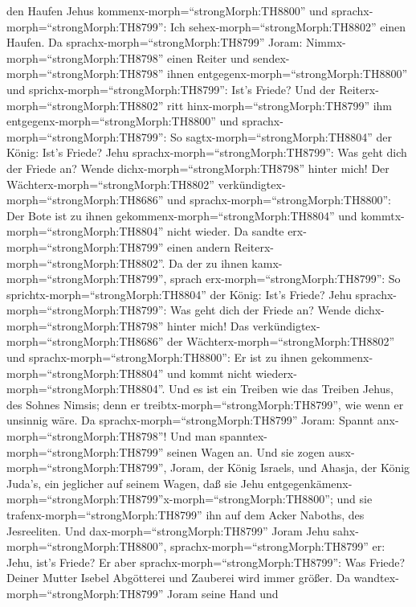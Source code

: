 den Haufen Jehus kommenx-morph=``strongMorph:TH8800'' und
sprachx-morph=``strongMorph:TH8799'': Ich
sehex-morph=``strongMorph:TH8802'' einen Haufen. Da
sprachx-morph=``strongMorph:TH8799'' Joram:
Nimmx-morph=``strongMorph:TH8798'' einen Reiter und
sendex-morph=``strongMorph:TH8798'' ihnen
entgegenx-morph=``strongMorph:TH8800'' und
sprichx-morph=``strongMorph:TH8799'': Ist's Friede?  Und
der Reiterx-morph=``strongMorph:TH8802'' ritt
hinx-morph=``strongMorph:TH8799'' ihm
entgegenx-morph=``strongMorph:TH8800'' und
sprachx-morph=``strongMorph:TH8799'': So
sagtx-morph=``strongMorph:TH8804'' der König: Ist's Friede? Jehu
sprachx-morph=``strongMorph:TH8799'': Was geht dich der Friede an? Wende
dichx-morph=``strongMorph:TH8798'' hinter mich! Der
Wächterx-morph=``strongMorph:TH8802''
verkündigtex-morph=``strongMorph:TH8686'' und
sprachx-morph=``strongMorph:TH8800'': Der Bote ist zu ihnen
gekommenx-morph=``strongMorph:TH8804'' und
kommtx-morph=``strongMorph:TH8804'' nicht wieder.  Da
sandte erx-morph=``strongMorph:TH8799'' einen andern
Reiterx-morph=``strongMorph:TH8802''. Da der zu ihnen
kamx-morph=``strongMorph:TH8799'', sprach
erx-morph=``strongMorph:TH8799'': So
sprichtx-morph=``strongMorph:TH8804'' der König: Ist's Friede? Jehu
sprachx-morph=``strongMorph:TH8799'': Was geht dich der Friede an? Wende
dichx-morph=``strongMorph:TH8798'' hinter mich!  Das
verkündigtex-morph=``strongMorph:TH8686'' der
Wächterx-morph=``strongMorph:TH8802'' und
sprachx-morph=``strongMorph:TH8800'': Er ist zu ihnen
gekommenx-morph=``strongMorph:TH8804'' und kommt nicht
wiederx-morph=``strongMorph:TH8804''. Und es ist ein Treiben wie das
Treiben Jehus, des Sohnes Nimsis; denn er
treibtx-morph=``strongMorph:TH8799'', wie wenn er unsinnig wäre.
 Da sprachx-morph=``strongMorph:TH8799'' Joram: Spannt
anx-morph=``strongMorph:TH8798''! Und man
spanntex-morph=``strongMorph:TH8799'' seinen Wagen an. Und sie zogen
ausx-morph=``strongMorph:TH8799'', Joram, der König Israels, und Ahasja,
der König Juda's, ein jeglicher auf seinem Wagen, daß sie Jehu
entgegenkämenx-morph=``strongMorph:TH8799''x-morph=``strongMorph:TH8800'';
und sie trafenx-morph=``strongMorph:TH8799'' ihn auf dem Acker Naboths,
des Jesreeliten.  Und dax-morph=``strongMorph:TH8799''
Joram Jehu sahx-morph=``strongMorph:TH8800'',
sprachx-morph=``strongMorph:TH8799'' er: Jehu, ist's Friede? Er aber
sprachx-morph=``strongMorph:TH8799'': Was Friede? Deiner Mutter Isebel
Abgötterei und Zauberei wird immer größer.  Da
wandtex-morph=``strongMorph:TH8799'' Joram seine Hand und
